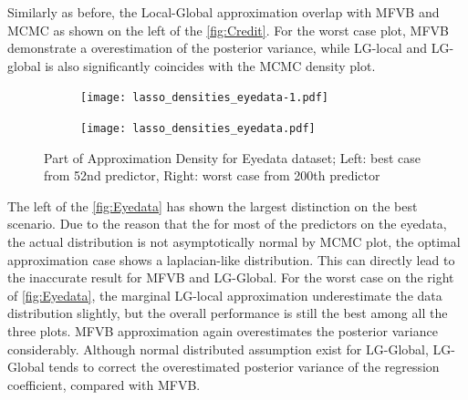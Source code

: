 Similarly as before, the Local-Global approximation overlap with MFVB and MCMC as shown on the left of the \autoref{fig:Credit}. For the worst case plot, MFVB demonstrate a overestimation of the posterior variance, while LG-local and LG-global is also significantly coincides with the MCMC density plot.\\
\begin{figure}[h]
	\begin{subfigure}{0.5\textwidth}
		\centering
		\texttt{[image: lasso\_densities\_eyedata-1.pdf]}
	\end{subfigure}
	\begin{subfigure}{0.5\textwidth}
		\texttt{[image: lasso\_densities\_eyedata.pdf]}
	\end{subfigure}
	\caption{Part of Approximation Density for Eyedata dataset; Left: best case from 52nd predictor, Right: worst case from 200th predictor}
	\label{fig:Eyedata}
\end{figure}
The left of the \autoref{fig:Eyedata} has shown the largest distinction on the best scenario. Due to the reason that the for most of the predictors on the eyedata, the actual distribution is not asymptotically normal by MCMC plot, the optimal approximation case shows a laplacian-like distribution. This can directly lead to the inaccurate result for MFVB and LG-Global.
For the worst case on the right of \autoref{fig:Eyedata}, the marginal LG-local approximation underestimate the data distribution slightly, but the overall performance is still the best among all the three plots. MFVB approximation again overestimates the posterior variance considerably.
Although normal distributed assumption exist for LG-Global, LG-Global tends to correct the overestimated posterior variance of the regression coefficient, compared with MFVB. \\
\newpage
